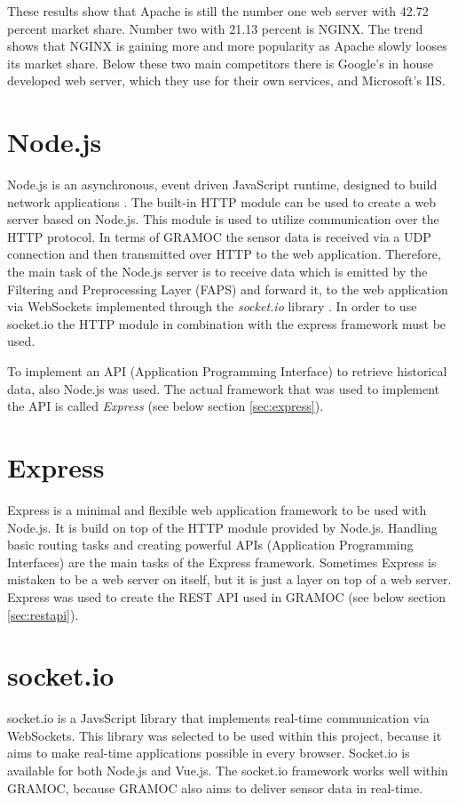 These results show that Apache is still the number one web server with 42.72 percent market share. Number two with 21.13 percent is NGINX. The trend shows that NGINX is gaining more and more popularity as Apache slowly looses its market share. Below these two main competitors there is Google's in house developed web server, which they use for their own services, and Microsoft's IIS.

\section{Node.js}
\label{sec:nodejs}
Node.js is an asynchronous, event driven JavaScript runtime, designed to build network applications \autocite{Node}. The built-in HTTP module can be used to create a web server based on Node.js. This module is used to utilize communication over the HTTP protocol. In terms of GRAMOC the sensor data is received via a UDP connection and then transmitted over HTTP to the web application. Therefore, the main task of the Node.js server is to receive data which is emitted by the Filtering and Preprocessing Layer (FAPS) and forward it, to the web application via WebSockets implemented through the \textit{socket.io} library \autocite{socketio}. In order to use socket.io the HTTP module in combination with the express framework must be used.

To implement an API (Application Programming Interface) to retrieve historical data, also Node.js was used. The actual framework that was used to implement the API is called \textit{Express} (see below section \vref{sec:express}).

\section{Express}
\label{sec:express}
Express is a minimal and flexible web application framework to be used with Node.js. It is build on top of the HTTP module provided by Node.js. Handling basic routing tasks and creating powerful APIs (Application Programming Interfaces) are the main tasks of the Express framework. Sometimes Express is mistaken to be a web server on itself, but it is just a layer on top of a web server. Express was used to create the REST API used in GRAMOC (see below section \vref{sec:restapi}).

\section{socket.io}
\label{sec:socketio}
socket.io is a JavsScript library that implements real-time communication via WebSockets. This library was selected to be used within this project, because it aims to make real-time applications possible in every browser. Socket.io is available for both Node.js and Vue.js. The socket.io framework works well within GRAMOC, because GRAMOC also aims to deliver sensor data in real-time.

